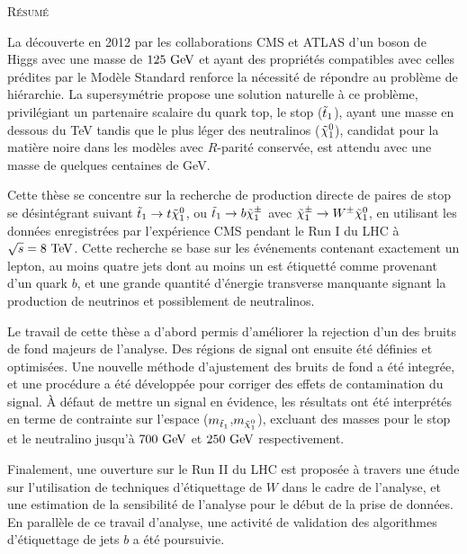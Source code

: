 \small{
\begin{framed}
    \vspace*{-0.7cm}
\begin{center}\textsc{Résumé}\end{center}
    \vspace*{-0.3cm}
    La découverte en 2012 par les collaborations CMS et ATLAS d'un boson de Higgs avec une
masse de $125~\text{GeV}$ et ayant des propriétés compatibles avec celles prédites par le
Modèle Standard renforce la nécessité de répondre au problème de hiérarchie. La
supersymétrie propose une solution naturelle à ce problème, privilégiant un
partenaire scalaire du quark top, le stop ($\tilde{t}_1$), ayant une masse en dessous du
TeV tandis que le plus léger des neutralinos ($\tilde{\chi}_1^0$), candidat pour
la matière noire dans les modèles avec $R$-parité conservée, est attendu avec une masse
de quelques centaines de GeV.

    Cette thèse se concentre sur la recherche de production directe de paires de stop
se désintégrant suivant $\tilde{t}_1 \rightarrow t \tilde{\chi}_1^0$, ou $\tilde{t}_1 \rightarrow b
\tilde{\chi}_1^\pm$ avec $\tilde{\chi}_1^\pm \rightarrow W^\pm \tilde{\chi}_1^0$, en utilisant les données
enregistrées par l'expérience CMS pendant le Run I du LHC à $\sqrt{s} = 8~\text{TeV}$. Cette recherche
se base sur les événements contenant exactement un lepton, au moins quatre jets dont au moins
un est étiquetté comme provenant d'un quark $b$, et une grande quantité d'énergie transverse
manquante signant la production de neutrinos et possiblement de neutralinos.

    Le travail de cette thèse a d'abord permis d'améliorer la rejection d'un des bruits
de fond majeurs de l'analyse. Des régions de signal ont ensuite été définies et optimisées.
Une nouvelle méthode d'ajustement des bruits de fond a été integrée, et une procédure a été développée pour corriger des effets de contamination
du signal. À défaut de mettre un signal en évidence, les résultats ont été interprétés en
terme de contrainte sur l'espace ($m_{\tilde{t}_1}$,$m_{\tilde{\chi}_1^0}$), excluant des masses
pour le stop et le neutralino jusqu'à $700~\text{GeV}$ et $250~\text{GeV}$ respectivement.

    Finalement, une ouverture sur le Run II du LHC est proposée à travers une étude sur
l'utilisation de techniques d'étiquettage de $W$ dans le cadre de l'analyse, et une
estimation de la sensibilité de l'analyse pour le début de la prise de données. En parallèle
de ce travail d'analyse, une activité de validation des algorithmes d'étiquettage de jets $b$
a été poursuivie.


\end{framed}}
